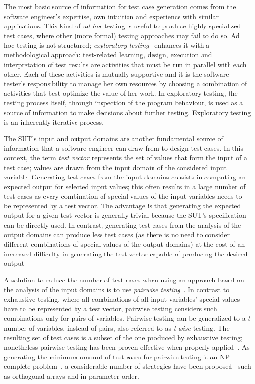 The most basic source of information for test case generation comes from the
software engineer's expertise, own intuition and experience with similar
applications. This kind of \emph{ad hoc} testing is useful to produce highly
specialized test cases, where other (more formal) testing approaches may fail to
do so. Ad hoc testing is not structured; \emph{exploratory
testing}~\cite{kaner2008tutorial, p29119-1} enhances it with a methodological
approach: test-related learning, design, execution and interpretation of test
results are activities that must be run in parallel with each other. Each of
these activities is mutually supportive and it is the software tester's
responsibility to manage her own resources by choosing a combination of
activities that best optimize the value of her work. In exploratory testing, the
testing process itself, through inspection of the program behaviour, is used as
a source of information to make decisions about further testing. Exploratory
testing is an inherently iterative process.

The \ac{SUT}'s input and output domains are another fundamental source of
information that a software engineer can draw from to design test cases. In this
context, the term \emph{test vector} represents the set of values that form the
input of a test case; values are drawn from the input domain of the considered
input variable. Generating test cases from the input domains consists in
computing an expected output for selected input values; this often results in a
large number of test cases as every combination of special values of the input
variables needs to be represented by a test vector. The advantage is that
generating the expected output for a given test vector is generally trivial
because the \ac{SUT}'s specification can be directly used. In contrast,
generating test cases from the analysis of the output domains can produce less
test cases (as there is no need to consider different combinations of special
values of the output domains) at the cost of an increased difficulty in
generating the test vector capable of producing the desired output.

A solution to reduce the number of test cases when using an approach based on
the analysis of the input domains is to use \emph{pairwise
testing}~\cite{mandl1985orthogonal, tatsumi1987test, czerwonka2006pairwise}. In
contrast to exhaustive testing, where all combinations of all input variables'
special values have to be represented by a test vector, pairwise testing
considers such combinations only for pairs of variables. Pairwise testing can be
generalized to a $t$ number of variables, instead of pairs, also referred to as
\emph{t-wise} testing. The resulting set of test cases is a subset of the one
produced by exhaustive testing; nonetheless pairwise testing has been proven
effective when properly applied~\cite{bach2004pairwise, kuhn2004software}. As
generating the minimum amount of test cases for pairwise testing is an
NP-complete problem~\cite{lei1998parameter}, a considerable number of strategies
have been proposed~\cite{grindal2005combination} such as orthogonal arrays and
in parameter order.

